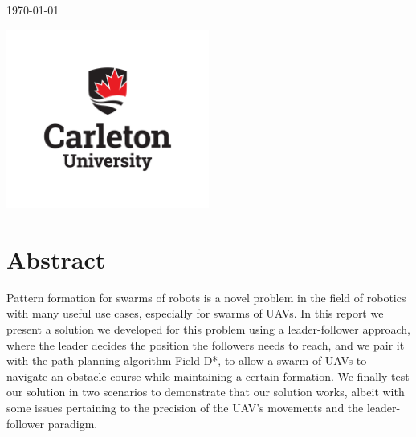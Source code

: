 \begin{titlepage}
	
	
	\vfill\vfill\vfill %
	
	{\large\today} %
	
	
	\vfill\vfill
	\includegraphics[width=0.5\textwidth]{img/B_Logo_V-RGBRedBlackonLight150_130821.png}\\[1cm] %
	 
	
	\vfill %
	
\end{titlepage}


\chapter*{Abstract}

Pattern formation for swarms of robots is a novel problem in the field of robotics
with many useful use cases, especially for swarms of UAVs. In this report we 
present a solution we developed for this problem using a leader-follower approach, 
where the leader decides the position the followers needs to reach, and we pair it 
with the path planning algorithm Field D*, to allow a swarm of UAVs to navigate an 
obstacle course while maintaining a certain formation. We finally test our solution 
in two scenarios to demonstrate that our solution works, albeit with some issues
pertaining to the precision of the UAV's movements and the leader-follower paradigm.

